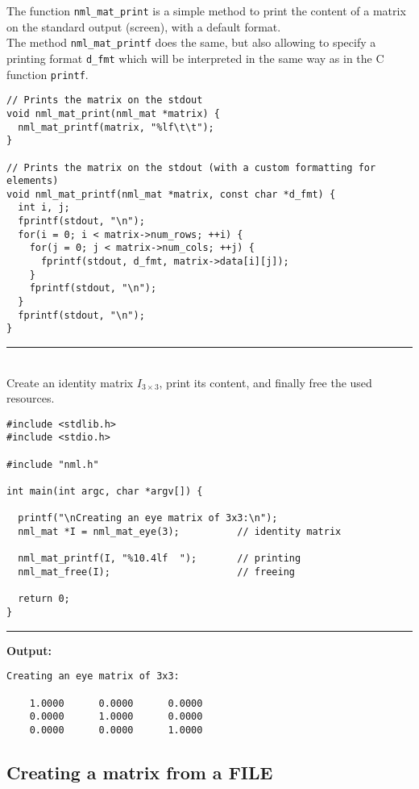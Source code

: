 The function {\tt nml\_mat\_print} is a simple method to print the content of a matrix on the standard output (screen), with a default format.
\\
The method {\tt nml\_mat\_printf} does the same, but also allowing to specify a printing format {\tt d\_fmt} which will be interpreted in the same way as in the C function {\tt printf}.

\begin{verbatim}
// Prints the matrix on the stdout
void nml_mat_print(nml_mat *matrix) {
  nml_mat_printf(matrix, "%lf\t\t");
}

// Prints the matrix on the stdout (with a custom formatting for elements)
void nml_mat_printf(nml_mat *matrix, const char *d_fmt) {
  int i, j;
  fprintf(stdout, "\n");
  for(i = 0; i < matrix->num_rows; ++i) {
    for(j = 0; j < matrix->num_cols; ++j) {
      fprintf(stdout, d_fmt, matrix->data[i][j]);
    }
    fprintf(stdout, "\n");
  }
  fprintf(stdout, "\n");
}
\end{verbatim}

\rule{\textwidth}{0.5pt}\\
\example \textsf{Create an identity matrix $I_{3\times 3}$, print its content, and finally free the used resources.}

\begin{verbatim}
#include <stdlib.h>
#include <stdio.h>

#include "nml.h"

int main(int argc, char *argv[]) {

  printf("\nCreating an eye matrix of 3x3:\n");
  nml_mat *I = nml_mat_eye(3);          // identity matrix

  nml_mat_printf(I, "%10.4lf  ");       // printing
  nml_mat_free(I);                      // freeing

  return 0;
}
\end{verbatim}

\rule{\textwidth}{0.5pt}
\textbf{Output:}
\begin{verbatim}
Creating an eye matrix of 3x3:

    1.0000      0.0000      0.0000  
    0.0000      1.0000      0.0000  
    0.0000      0.0000      1.0000  
\end{verbatim}

\subsection{Creating a matrix from a FILE}


